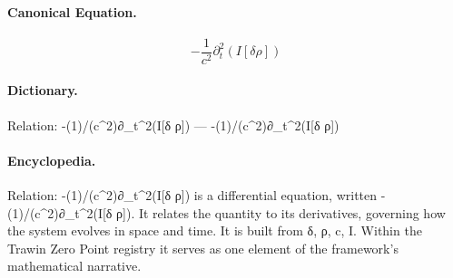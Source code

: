 \paragraph{Canonical Equation.}
\[
-\frac{1}{c^2}\partial_t^2(I[\delta \rho])
\]

\paragraph{Dictionary.}
Relation: -(1)/(c\textasciicircum{}2)∂\_t\textasciicircum{}2(I[δ ρ]) — -(1)/(c\textasciicircum{}2)∂\_t\textasciicircum{}2(I[δ ρ])

\paragraph{Encyclopedia.}
Relation: -(1)/(c\textasciicircum{}2)∂\_t\textasciicircum{}2(I[δ ρ]) is a differential equation, written -(1)/(c\textasciicircum{}2)∂\_t\textasciicircum{}2(I[δ ρ]). It relates the quantity to its derivatives, governing how the system evolves in space and time. It is built from δ, ρ, c, I. Within the Trawin Zero Point registry it serves as one element of the framework's mathematical narrative.
